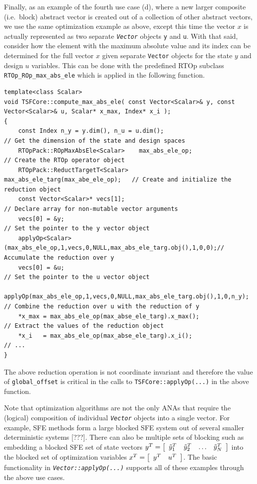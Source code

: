 \documentclass[10pt,fleqn]{article}
\begin{document}
Finally, as an example of the fourth use case (d), where a new larger
composite (i.e.~block) abstract vector is created out of a collection
of other abstract vectors, we use the same optimization example as
above, except this time the vector $x$ is actually represented as two
separate \texttt{\textit{Vector}} objects \texttt{y} and \texttt{u}.
With that said, consider how the element with the maximum absolute
value and its index can be determined for the full vector $x$ given
separate \texttt{Vector} objects for the state $y$ and design $u$
variables.  This can be done with the predefined RTOp subclass
\texttt{RTOp\_ROp\_max\_abs\_ele} which is applied in the following
function.

{\scriptsize\begin{verbatim}
template<class Scalar>
void TSFCore::compute_max_abs_ele( const Vector<Scalar>& y, const Vector<Scalar>& u, Scalar* x_max, Index* x_i );
{
    const Index n_y = y.dim(), n_u = u.dim();                             // Get the dimension of the state and design spaces
    RTOpPack::ROpMaxAbsEle<Scalar>    max_abs_ele_op;                     // Create the RTOp operator object
    RTOpPack::ReductTargetT<Scalar>   max_abs_ele_targ(max_abe_ele_op);   // Create and initialize the reduction object
    const Vector<Scalar>* vecs[1];                                        // Declare array for non-mutable vector arguments
    vecs[0] = &y;                                                         // Set the pointer to the y vector object
    applyOp<Scalar>(max_abs_ele_op,1,vecs,0,NULL,max_abs_ele_targ.obj(),1,0,0);// Accumulate the reduction over y
    vecs[0] = &u;                                                         // Set the pointer to the u vector object
    applyOp(max_abs_ele_op,1,vecs,0,NULL,max_abs_ele_targ.obj(),1,0,n_y); // Combine the reduction over u with the reduction of y
    *x_max = max_abs_ele_op(max_abse_ele_targ).x_max();                   // Extract the values of the reduction object
    *x_i   = max_abs_ele_op(max_abse_ele_targ).x_i();                     // ...
}
\end{verbatim}}

The above reduction operation is not coordinate invariant and
therefore the value of \texttt{global\_offset} is critical in the
calls to \texttt{TSFCore\-::applyOp(...)} in the above function.

Note that optimization algorithms are not the only ANAs that require
the (logical) composition of individual \texttt{\textit{Vector}}
objects into a single vector.  For example, SFE methods form a large
blocked SFE system out of several smaller deterministic systems [???].
There can also be multiple sets of blocking such as embedding a
blocked SFE set of state vectors $y^T = \bmat{cccc} \tilde{y}_1^T &
\tilde{y}_2^T & \ldots & \tilde{y}_N^T \emat$ into the blocked set of
optimization variables $x^T = \bmat{cc} y^T & u^T \emat$.  The basic
functionality in \texttt{\textit{Vector\-::applyOp(...)}} supports all
of these examples through the above use cases.
\end{document}
